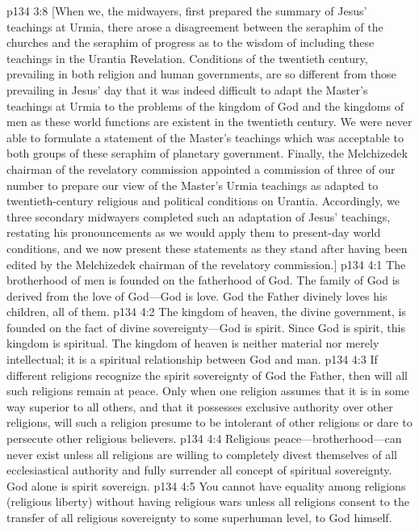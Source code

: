 \pc \vs p134 3:8 [When we, the midwayers, first prepared the summary of Jesus’ teachings at Urmia, there arose a disagreement between the seraphim of the churches and the seraphim of progress as to the wisdom of including these teachings in the Urantia Revelation. Conditions of the twentieth century, prevailing in both religion and human governments, are so different from those prevailing in Jesus’ day that it was indeed difficult to adapt the Master’s teachings at Urmia to the problems of the kingdom of God and the kingdoms of men as these world functions are existent in the twentieth century. We were never able to formulate a statement of the Master’s teachings which was acceptable to both groups of these seraphim of planetary government. Finally, the Melchizedek chairman of the revelatory commission appointed a commission of three of our number to prepare our view of the Master’s Urmia teachings as adapted to twentieth\hyp{}century religious and political conditions on Urantia. Accordingly, we three secondary midwayers completed such an adaptation of Jesus’ teachings, restating his pronouncements as we would apply them to present\hyp{}day world conditions, and we now present these statements as they stand after having been edited by the Melchizedek chairman of the revelatory commission.]\plusone
{}
\vs p134 4:1 The brotherhood of men is founded on the fatherhood of God. The family of God is derived from the love of God---God is love. God the Father divinely loves his children, all of them.
\vs p134 4:2 The kingdom of heaven, the divine government, is founded on the fact of divine sovereignty---God is spirit. Since God is spirit, this kingdom is spiritual. The kingdom of heaven is neither material nor merely intellectual; it is a spiritual relationship between God and man.
\vs p134 4:3 If different religions recognize the spirit sovereignty of God the Father, then will all such religions remain at peace. Only when one religion assumes that it is in some way superior to all others, and that it possesses exclusive authority over other religions, will such a religion presume to be intolerant of other religions or dare to persecute other religious believers.
\vs p134 4:4 Religious peace---brotherhood---can never exist unless all religions are willing to completely divest themselves of all ecclesiastical authority and fully surrender all concept of spiritual sovereignty. God alone is spirit sovereign.
\vs p134 4:5 You cannot have equality among religions (religious liberty) without having religious wars unless all religions consent to the transfer of all religious sovereignty to some superhuman level, to God himself.
